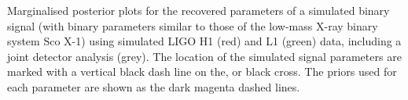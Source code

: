 \label{fig:scox1_inj}
Marginalised posterior plots for the recovered parameters of a simulated binary signal (with binary parameters
similar to those of the low-mass X-ray binary system Sco X-1) using simulated LIGO H1 (red) and L1 (green) data, including a joint detector analysis
(grey). The location of the simulated signal parameters are marked with a vertical black dash line on the, or black
cross. The priors used for each parameter are shown as the dark magenta dashed lines.
